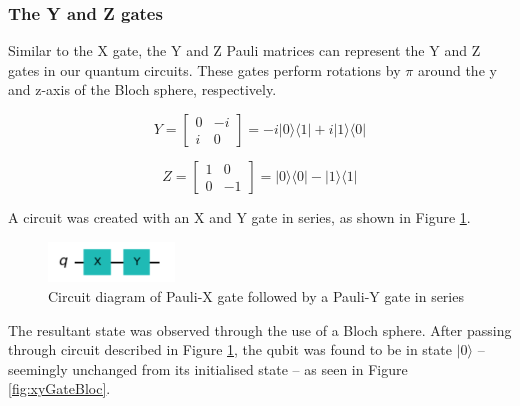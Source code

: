 \subsubsection{The Y and Z gates}

Similar to the X gate, the Y and Z Pauli matrices can represent the Y and Z gates in our quantum circuits. These gates perform rotations by $\pi$ around the y and z-axis of the Bloch sphere, respectively.

$$ Y = \begin{bmatrix} 0 & -i \\ i & 0 \end{bmatrix} = -i|0\rangle\langle1| + i|1\rangle\langle0| $$

$$ Z = \begin{bmatrix} 1 & 0 \\ 0 & -1 \end{bmatrix} = |0\rangle\langle0| - |1\rangle\langle1| $$

A circuit was created with an X and Y gate in series, as shown in Figure \ref{fig:xyGateDiagram}.

\begin{figure}[h]
    \centering
    \includegraphics[width=0.3\textwidth]{lab2/images/xyGate.png}
    \caption{Circuit diagram of Pauli-X gate followed by a Pauli-Y gate in series} 
    \label{fig:xyGateDiagram}
\end{figure}

The resultant state was observed through the use of a Bloch sphere. After passing through circuit described in Figure \ref{fig:xyGateDiagram}, the qubit was found to be in state $|0\rangle$ -- seemingly unchanged from its initialised state -- as seen in Figure \ref{fig:xyGateBloc}.

